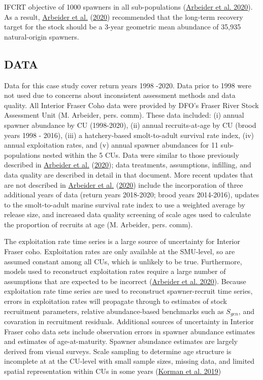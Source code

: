 \documentclass[11pt]{book}
\begin{document}
IFCRT objective of 1000 spawners in all sub-populations (\protect\hyperlink{ref-arbeiderInteriorFraserCoho2020}{Arbeider et al. 2020}). As a result, \protect\hyperlink{ref-arbeiderInteriorFraserCoho2020}{Arbeider et al.} (\protect\hyperlink{ref-arbeiderInteriorFraserCoho2020}{2020}) recommended that the long-term recovery target for the stock should be a 3-year geometric mean abundance of 35,935 natural-origin spawners.

\hypertarget{cohoData}{%
\subsection{DATA}\label{cohoData}}

Data for this case study cover return years 1998 -2020. Data prior to 1998 were not used due to concerns about inconsistent assessment methods and data quality. All Interior Fraser Coho data were provided by DFO's Fraser River Stock Assessment Unit (M. Arbeider, pers. comm). These data included: (i) annual spawner abundance by CU (1998-2020), (ii) annual recruits-at-age by CU (brood years 1998 - 2016), (iii) a hatchery-based smolt-to-adult survival rate index, (iv) annual exploitation rates, and (v) annual spawner abundances for 11 sub-populations nested within the 5 CUs. Data were similar to those previously described in \protect\hyperlink{ref-arbeiderInteriorFraserCoho2020}{Arbeider et al.} (\protect\hyperlink{ref-arbeiderInteriorFraserCoho2020}{2020}); data treatments, assumptions, infilling, and data quality are described in detail in that document. More recent updates that are not described in \protect\hyperlink{ref-arbeiderInteriorFraserCoho2020}{Arbeider et al.} (\protect\hyperlink{ref-arbeiderInteriorFraserCoho2020}{2020}) include the incorporation of three additional years of data (return years 2018-2020; brood years 2014-2016), updates to the smolt-to-adult marine survival rate index to use a weighted average by release size, and increased data quality screening of scale ages used to calculate the proportion of recruits at age (M. Arbeider, pers. comm).

The exploitation rate time series is a large source of uncertainty for Interior Fraser coho. Exploitation rates are only available at the SMU-level, so are assumed constant among all CUs, which is unlikely to be true. Furthermore, models used to reconstruct exploitation rates require a large number of assumptions that are expected to be incorrect (\protect\hyperlink{ref-arbeiderInteriorFraserCoho2020}{Arbeider et al. 2020}). Because exploitation rate time series are used to reconstruct spawner-recruit time series, errors in exploitation rates will propagate through to estimates of stock recruitment parameters, relative abundance-based benchmarks such as \(S_{gen}\), and covaration in recruitment residuals. Additional sources of uncertainty in Interior Fraser coho data sets include observation errors in spawner abundance estimates and estimates of age-at-maturity. Spawner abundance estimates are largely derived from visual surveys. Scale sampling to determine age structure is incomplete at at the CU-level with small sample sizes, missing data, and limited spatial representation within CUs in some years (\protect\hyperlink{ref-kormanEvaluationFrameworkAssessing2019}{Korman et al. 2019})
\end{document}
